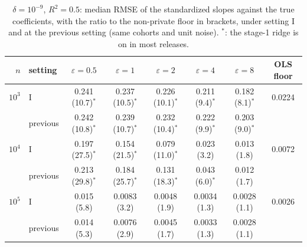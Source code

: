 \documentclass[11pt]{article}
\theoremstyle{definition}
\theoremstyle{plain}
\begin{document}
\begin{table}[t]
  \centering
  \small
  \caption{$\delta = 10^{-9}$, $R^{2} = 0.5$: median RMSE of the standardized slopes against the true coefficients, with the ratio to the non-private floor in brackets, under setting I and at the previous setting (same cohorts and unit noise). $^\ast$: the stage-1 ridge is on in most releases.}
  \label{tab:sim_rmse_v31}
  \setlength{\tabcolsep}{4.5pt}
  \begin{tabular}{@{}rlcccccc@{}}
    \toprule
    $n$ & setting & $\varepsilon = 0.5$ & $\varepsilon = 1$ & $\varepsilon = 2$ & $\varepsilon = 4$ & $\varepsilon = 8$ & OLS floor \\
    \midrule
    $10^{3}$ & I & 0.241 (10.7)$^\ast$ & 0.237 (10.5)$^\ast$ & 0.226 (10.1)$^\ast$ & 0.211 (9.4)$^\ast$ & 0.182 (8.1)$^\ast$ & 0.0224 \\
     & previous & 0.242 (10.8)$^\ast$ & 0.239 (10.7)$^\ast$ & 0.232 (10.4)$^\ast$ & 0.222 (9.9)$^\ast$ & 0.203 (9.0)$^\ast$ & \\
    $10^{4}$ & I & 0.197 (27.5)$^\ast$ & 0.154 (21.5)$^\ast$ & 0.079 (11.0)$^\ast$ & 0.023 (3.2) & 0.013 (1.8) & 0.0072 \\
     & previous & 0.213 (29.8)$^\ast$ & 0.184 (25.7)$^\ast$ & 0.131 (18.3)$^\ast$ & 0.043 (6.0)$^\ast$ & 0.012 (1.7) & \\
    $10^{5}$ & I & 0.015 (5.8) & 0.0083 (3.2) & 0.0048 (1.9) & 0.0034 (1.3) & 0.0028 (1.1) & 0.0026 \\
     & previous & 0.014 (5.3) & 0.0076 (2.9) & 0.0045 (1.7) & 0.0033 (1.3) & 0.0028 (1.1) & \\
    \bottomrule
  \end{tabular}
\end{table}
\end{document}
